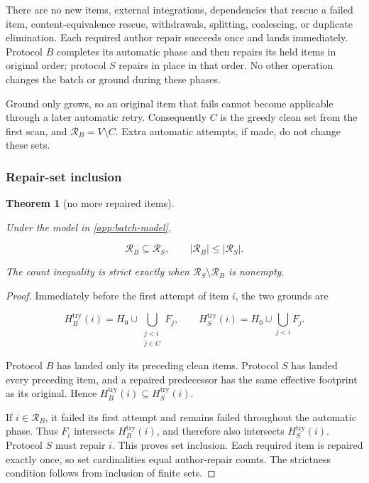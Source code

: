 \documentclass[pdflatex,sn-mathphys-ay]{sn-jnl}
\theoremstyle{thmstyleone}
\newtheorem{theorem}{Theorem}[section]
\theoremstyle{thmstylethree}
\begin{document}
\begin{appendices}
There are no new items, external integrations, dependencies that rescue a failed item, content-equivalence rescue, withdrawals, splitting, coalescing, or duplicate elimination. Each required author repair succeeds once and lands immediately. Protocol \(B\) completes its automatic phase and then repairs its held items in original order; protocol \(S\) repairs in place in that order. No other operation changes the batch or ground during these phases.

Ground only grows, so an original item that fails cannot become applicable through a later automatic retry. Consequently \(C\) is the greedy clean set from the first scan, and \(\mathcal R_B=V\setminus C\). Extra automatic attempts, if made, do not change these sets.

\subsubsection{Repair-set inclusion}\label{app:repair-set-inclusion}

\begin{theorem}[no more repaired items]\label{thm:repair-inclusion}

Under the model in \ref{app:batch-model},

\[
\mathcal R_B\subseteq\mathcal R_S,
\qquad
|\mathcal R_B|\le|\mathcal R_S|.
\]

The count inequality is strict exactly when \(\mathcal R_S\setminus\mathcal R_B\) is nonempty.

\end{theorem}
\begin{proof}

Immediately before the first attempt of item \(i\), the two grounds are

\[
H_B^{\mathrm{try}}(i)
=H_0\cup\bigcup_{\substack{j<i\\j\in C}}F_j,
\qquad
H_S^{\mathrm{try}}(i)
=H_0\cup\bigcup_{j<i}F_j.
\]

Protocol \(B\) has landed only its preceding clean items. Protocol \(S\) has landed every preceding item, and a repaired predecessor has the same effective footprint as its original. Hence \(H_B^{\mathrm{try}}(i)\subseteq H_S^{\mathrm{try}}(i)\).

If \(i\in\mathcal R_B\), it failed its first attempt and remains failed throughout the automatic phase. Thus \(F_i\) intersects \(H_B^{\mathrm{try}}(i)\), and therefore also intersects \(H_S^{\mathrm{try}}(i)\). Protocol \(S\) must repair \(i\). This proves set inclusion. Each required item is repaired exactly once, so set cardinalities equal author-repair counts. The strictness condition follows from inclusion of finite sets.


\end{proof}
\end{appendices}
\end{document}
